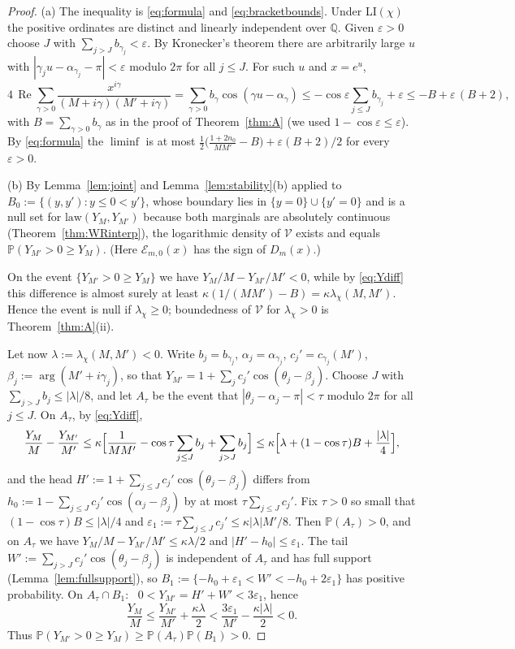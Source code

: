 \documentclass[11pt]{amsart}
\theoremstyle{definition}
\numberwithin{equation}{section}
\newcommand{\eps}{\varepsilon}
\newcommand{\PP}{\mathbb P}
\newcommand{\cE}{\mathcal E}
\newcommand{\re}{\operatorname{Re}}
\begin{document}
\begin{proof}
(a) The inequality is \eqref{eq:formula} and
\eqref{eq:bracketbounds}. Under LI$(\chi)$ the positive ordinates are
distinct and linearly independent over $\mathbb Q$. Given $\eps>0$
choose $J$ with $\sum_{j>J}b_{\gamma_j}<\eps$. By Kronecker's theorem
\cite[Ch.~XXIII]{HW} there are arbitrarily large $u$ with
$|\gamma_ju-\alpha_{\gamma_j}-\pi|<\eps$ modulo $2\pi$ for all
$j\le J$. For such $u$ and $x=e^u$,
\[
4\,\re\sum_{\gamma>0}\frac{x^{i\gamma}}{(M+i\gamma)(M'+i\gamma)}
=\sum_{\gamma>0}b_\gamma\cos(\gamma u-\alpha_\gamma)
\le-\cos\eps\sum_{j\le J}b_{\gamma_j}+\eps
\le-B+\eps\,(B+2),
\]
with $B=\sum_{\gamma>0}b_\gamma$ as in the proof of
Theorem~\ref{thm:A} (we used $1-\cos\eps\le\eps$). By
\eqref{eq:formula} the $\liminf$ is at most
$\frac12\bigl(\frac{1+2n_0}{MM'}-B\bigr)+\eps(B+2)/2$ for every
$\eps>0$.

(b) By Lemma~\ref{lem:joint} and Lemma~\ref{lem:stability}(b) applied
to $B_0:=\{(y,y'):y\le0<y'\}$, whose boundary lies in
$\{y=0\}\cup\{y'=0\}$ and is a null set for $\mathrm{law}(Y_M,Y_{M'})$
because both marginals are absolutely continuous
(Theorem~\ref{thm:WRinterp}), the logarithmic density of $\mathcal V$
exists and equals $\PP(Y_{M'}>0\ge Y_M)$. (Here
$\cE_{m,0}(x)$ has the sign of $D_m(x)$.)

On the event $\{Y_{M'}>0\ge Y_M\}$ we have $Y_M/M-Y_{M'}/M'<0$,
while by \eqref{eq:Ydiff} this difference is almost surely at least
$\kappa(1/(MM')-B)=\kappa\lambda_\chi(M,M')$. Hence the event is null
if $\lambda_\chi\ge0$; boundedness of $\mathcal V$ for
$\lambda_\chi>0$ is Theorem~\ref{thm:A}(ii).

Let now $\lambda:=\lambda_\chi(M,M')<0$. Write
$b_j=b_{\gamma_j}$, $\alpha_j=\alpha_{\gamma_j}$,
$c_j'=c_{\gamma_j}(M')$, $\beta_j:=\arg(M'+i\gamma_j)$, so that
$Y_{M'}=1+\sum_jc_j'\cos(\theta_j-\beta_j)$. Choose $J$ with
$\sum_{j>J}b_j\le|\lambda|/8$, and let $A_\tau$ be the event that
$|\theta_j-\alpha_j-\pi|<\tau$ modulo $2\pi$ for all $j\le J$. On
$A_\tau$, by \eqref{eq:Ydiff},
\[
\frac{Y_M}{M}-\frac{Y_{M'}}{M'}
\le\kappa\Bigl[\frac1{MM'}-\cos\tau\sum_{j\le J}b_j+\sum_{j>J}b_j\Bigr]
\le\kappa\Bigl[\lambda+(1-\cos\tau)B+\frac{|\lambda|}{4}\Bigr],
\]
and the head $H':=1+\sum_{j\le J}c_j'\cos(\theta_j-\beta_j)$ differs
from $h_0:=1-\sum_{j\le J}c_j'\cos(\alpha_j-\beta_j)$ by at most
$\tau\sum_{j\le J}c_j'$. Fix $\tau>0$ so small that
$(1-\cos\tau)B\le|\lambda|/4$ and
$\eps_1:=\tau\sum_{j\le J}c_j'\le\kappa|\lambda|M'/8$. Then
$\PP(A_\tau)>0$, and on $A_\tau$ we have
$Y_M/M-Y_{M'}/M'\le\kappa\lambda/2$ and $|H'-h_0|\le\eps_1$. The tail
$W':=\sum_{j>J}c_j'\cos(\theta_j-\beta_j)$ is independent of $A_\tau$
and has full support (Lemma~\ref{lem:fullsupport}), so
$B_1:=\{-h_0+\eps_1<W'<-h_0+2\eps_1\}$ has positive probability. On
$A_\tau\cap B_1$: \ $0<Y_{M'}=H'+W'<3\eps_1$, hence
\[
\frac{Y_M}{M}\le\frac{Y_{M'}}{M'}+\frac{\kappa\lambda}{2}
<\frac{3\eps_1}{M'}-\frac{\kappa|\lambda|}{2}<0 .
\]
Thus $\PP(Y_{M'}>0\ge Y_M)\ge\PP(A_\tau)\PP(B_1)>0$.
\end{proof}
\end{document}
